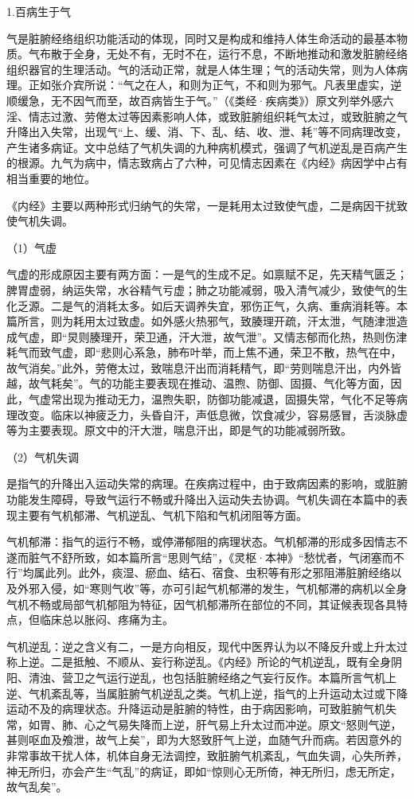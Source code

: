 \documentclass[draft,12pt]{ctexbook}
\begin{document}

1.百病生于气

气是脏腑经络组织功能活动的体现，同时又是构成和维持人体生命活动的最基本物质。气布散于全身，无处不有，无时不在，运行不息，不断地推动和激发脏腑经络组织器官的生理活动。气的活动正常，就是人体生理；气的活动失常，则为人体病理。正如张介宾所说：“气之在人，和则为正气，不和则为邪气。凡表里虚实，逆顺缓急，无不因气而至，故百病皆生于气。”（《类经·疾病类》）原文列举外感六淫、情志过激、劳倦太过等因素影响人体，或致脏腑组织耗气太过，或致脏腑之气升降出入失常，出现气“上、缓、消、下、乱、结、收、泄、耗”等不同病理改变，产生诸多病证。文中总结了气机失调的九种病机模式，强调了气机逆乱是百病产生的根源。九气为病中，情志致病占了六种，可见情志因素在《内经》病因学中占有相当重要的地位。

《内经》主要以两种形式归纳气的失常，一是耗用太过致使气虚，二是病因干扰致使气机失调。

（1）气虚

气虚的形成原因主要有两方面：一是气的生成不足。如禀赋不足，先天精气匮乏；脾胃虚弱，纳运失常，水谷精气亏虚；肺之功能减弱，吸入清气减少，致使气的生化乏源。二是气的消耗太多。如后天调养失宜，邪伤正气，久病、重病消耗等。本篇所言，则为耗用太过致虚。如外感火热邪气，致腠理开疏，汗太泄，气随津泄造成气虚，即“炅则腠理开，荣卫通，汗大泄，故气泄”。又情志郁而化热，热则伤津耗气而致气虚，即“悲则心系急，肺布叶举，而上焦不通，荣卫不散，热气在中，故气消矣。”此外，劳倦太过，致喘息汗出而消耗精气，即“劳则喘息汗出，内外皆越，故气耗矣”。气的功能主要表现在推动、温煦、防御、固摄、气化等方面，因此，气虚常出现为推动无力，温煦失职，防御功能减退，固摄失常，气化不足等病理改变。临床以神疲乏力，头昏自汗，声低息微，饮食减少，容易感冒，舌淡脉虚等为主要表现。原文中的汗大泄，喘息汗出，即是气的功能减弱所致。

（2）气机失调

是指气的升降出入运动失常的病理。在疾病过程中，由于致病因素的影响，或脏腑功能发生障碍，导致气运行不畅或升降出入运动失去协调。气机失调在本篇中的表现主要有气机郁滞、气机逆乱、气机下陷和气机闭阻等方面。

气机郁滞：指气的运行不畅，或停滞郁阻的病理状态。气机郁滞的形成多因情志不遂而脏气不舒所致，如本篇所言“思则气结”，《灵枢·本神》“愁忧者，气闭塞而不行”均属此列。此外，痰湿、瘀血、结石、宿食、虫积等有形之邪阻滞脏腑经络以及外邪入侵，如“寒则气收”等，亦可引起气机郁滞的发生，气机郁滞的病机以全身气机不畅或局部气机郁阻为特征，因气机郁滞所在部位的不同，其证候表现各具特点，但临床总以胀闷、疼痛为主。

气机逆乱：逆之含义有二，一是方向相反，现代中医界认为以不降反升或上升太过称上逆。二是抵触、不顺从、妄行称逆乱。《内经》所论的气机逆乱，既有全身阴阳、清浊、营卫之气运行逆乱，也包括脏腑经络之气妄行反作。本篇所言气机上逆、气机紊乱等，当属脏腑气机逆乱之类。气机上逆，指气的上升运动太过或下降运动不及的病理状态。升降运动是脏腑的特性，由于病因影响，可致脏腑气机失常，如胃、肺、心之气易失降而上逆，肝气易上升太过而冲逆。原文“怒则气逆，甚则呕血及飧泄，故气上矣”，即为大怒致肝气上逆，血随气升而病。若因意外的非常事故干扰人体，机体自身无法调控，致脏腑气机紊乱，气血失调，心失所养，神无所归，亦会产生“气乱”的病证，即如“惊则心无所倚，神无所归，虑无所定，故气乱矣”。
\end{document}
